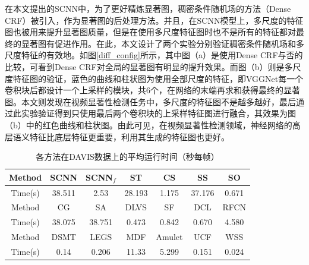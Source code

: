 在本文提出的SCNN中，为了更好精炼显著图，稠密条件随机场的方法（Dense CRF）被引入，作为显著图的后处理方法。并且，在SCNN模型上，多尺度的特征图也被用来提升显著图质量，但是在使用多尺度特征图时也不是所有的特征都对最终的显著图有促进作用。在此，本文设计了两个实验分别验证稠密条件随机场和多尺度特征的有效地。如图\ref{diff_config}所示，其中图（a）是使用Dense CRF与否的比较，可看到Dense CRF对全局的显著图有明显的提升效果。而图（b）则是多尺度特征图的验证，蓝色的曲线和柱状图为使用全部尺度的特征，即VGGNet每一个卷积块后都设计一个上采样的模块，共6个，在网络的末端再求和获得最终的显著图。本文则发现在视频显著性检测任务中，多尺度的特征图不是越多越好，最后通过此实验验证得到只使用最后两个卷积块的上采样特征图进行融合，其效果为图（b）中的红色曲线和柱状图。由此可见，在视频显著性检测领域，神经网络的高层语义特征比底层特征更重要，利用其生成的特征图也更好。

\begin{table}[htbp]
\centering
\caption{各方法在DAVIS数据上的平均运行时间（秒每帧）}
\renewcommand{\arraystretch}{1.2}
\begin{tabular}{|c|c|c|c|c|c|c|}
\hline
\hline
Method &SCNN  &SCNN$_f$ &ST  &CS        &SS  &SO  \\
\hline
Time(s) &38.511 &2.53 &28.193 &1.175   &37.176 &0.671 \\
\hline
\hline
Method   &CG   &SA     &DLVS  &SF   &DCL    &RFCN        \\
\hline
Time(s)  &38.075  &38.751  &0.473 &0.842 &0.670   &4.580         \\
\hline
\hline
Method        &DSMT   &LEGS &MDF   &Amulet   &UCF  &WSS\\
\hline
Time(s)       &0.14     &0.206  &11.33 &5.299   &0.151 &0.024\\
\hline
\end{tabular}
\label{table2}
\end{table}

